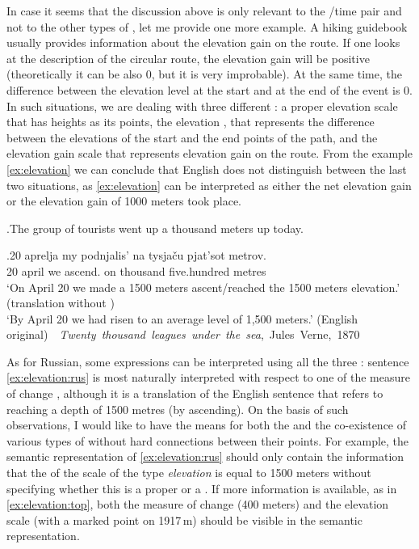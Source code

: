 In case it seems that the discussion above is only relevant to the /time pair and not to the other types of , let me provide one more example. A hiking guidebook usually provides information about the elevation gain on the route. If one looks at the description of the circular route, the elevation gain will be positive (theoretically it can be also 0, but it is very improbable). At the same time, the difference between the elevation level at the start and at the end of the event is 0. In such situations, we are dealing with three different : a proper elevation scale that has heights as its points, the elevation , that represents the difference between the elevations of the start and the end points of the path, and the elevation gain scale that represents  elevation gain on the route. From the example \ref{ex:elevation} we can conclude that English does not distinguish between the last two situations, as \ref{ex:elevation} can be interpreted as either the net elevation gain or the  elevation gain of 1000 meters took place. 

\ex.\label{ex:elevation}The group of tourists went up a thousand meters up today.

\exg.\label{ex:elevation:rus}20 aprelja my podnjalis' na tysja\v{c}u pjat'sot metrov.\\
20 april we ascend. on thousand five.hundred metres\\
\trans `On April 20 we made a 1500 meters ascent/reached the 1500 meters elevation.' (translation without )\\
`By April 20 we had risen to an average level of 1,500 meters.' (English original)~~\hbox{}\hfill\hbox{\textit{Twenty thousand leagues under the sea}, Jules Verne, 1870}

As for Russian, some expressions can be interpreted using all the three : sentence \ref{ex:elevation:rus} is most naturally interpreted with respect to one of the measure of change , although it is a translation of the English sentence that refers to reaching a depth of 1500 metres (by ascending). On the basis of such observations, I would like to have the means for both the  and the co-existence of various types of  without hard connections between their points. For example, the semantic representation of \ref{ex:elevation:rus} should only contain the information that the  of the scale of the type \textit{elevation} is equal to 1500 meters without specifying whether this is a proper or a . If more information is available, as in \ref{ex:elevation:top}, both the measure of change (400 meters) and the elevation scale (with a marked point on 1917\,m) should be visible in the semantic representation.

